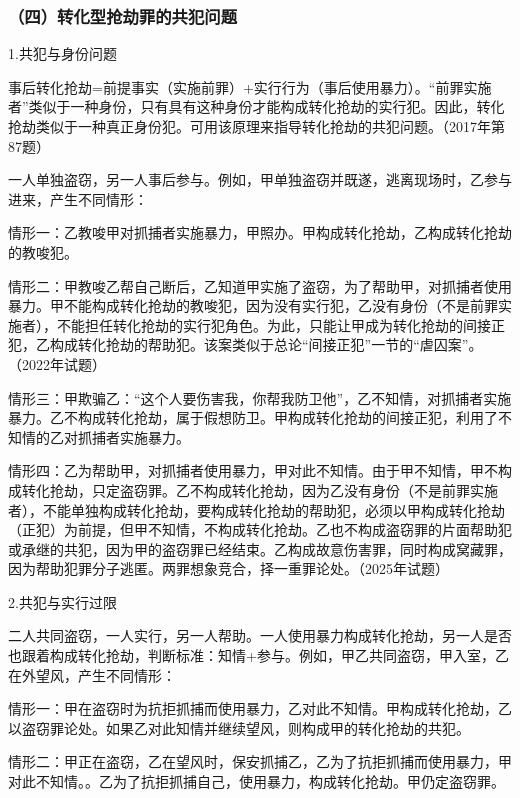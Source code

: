 \subsubsection*{（四）转化型抢劫罪的共犯问题}

1.共犯与身份问题

事后转化抢劫=前提事实（实施前罪）+实行行为（事后使用暴力）。“前罪实施者”类似于一种身份，只有具有这种身份才能构成转化抢劫的实行犯。因此，转化抢劫类似于一种真正身份犯。可用该原理来指导转化抢劫的共犯问题。（2017年第87题）

一人单独盗窃，另一人事后参与。例如，甲单独盗窃并既遂，逃离现场时，乙参与进来，产生不同情形：

情形一：乙教唆甲对抓捕者实施暴力，甲照办。甲构成转化抢劫，乙构成转化抢劫的教唆犯。

情形二：甲教唆乙帮自己断后，乙知道甲实施了盗窃，为了帮助甲，对抓捕者使用暴力。甲不能构成转化抢劫的教唆犯，因为没有实行犯，乙没有身份（不是前罪实施者），不能担任转化抢劫的实行犯角色。为此，只能让甲成为转化抢劫的间接正犯，乙构成转化抢劫的帮助犯。该案类似于总论“间接正犯”一节的“虐囚案”。（2022年试题）

情形三：甲欺骗乙：“这个人要伤害我，你帮我防卫他”，乙不知情，对抓捕者实施暴力。乙不构成转化抢劫，属于假想防卫。甲构成转化抢劫的间接正犯，利用了不知情的乙对抓捕者实施暴力。

情形四：乙为帮助甲，对抓捕者使用暴力，甲对此不知情。由于甲不知情，甲不构成转化抢劫，只定盗窃罪。乙不构成转化抢劫，因为乙没有身份（不是前罪实施者），不能单独构成转化抢劫，要构成转化抢劫的帮助犯，必须以甲构成转化抢劫（正犯）为前提，但甲不知情，不构成转化抢劫。乙也不构成盗窃罪的片面帮助犯或承继的共犯，因为甲的盗窃罪已经结束。乙构成故意伤害罪，同时构成窝藏罪，因为帮助犯罪分子逃匿。两罪想象竞合，择一重罪论处。（2025年试题）

2.共犯与实行过限

二人共同盗窃，一人实行，另一人帮助。一人使用暴力构成转化抢劫，另一人是否也跟着构成转化抢劫，判断标准：知情+参与。例如，甲乙共同盗窃，甲入室，乙在外望风，产生不同情形：

情形一：甲在盗窃时为抗拒抓捕而使用暴力，乙对此不知情。甲构成转化抢劫，乙以盗窃罪论处。如果乙对此知情并继续望风，则构成甲的转化抢劫的共犯。

情形二：甲正在盗窃，乙在望风时，保安抓捕乙，乙为了抗拒抓捕而使用暴力，甲对此不知情。。乙为了抗拒抓捕自己，使用暴力，构成转化抢劫。甲仍定盗窃罪。

